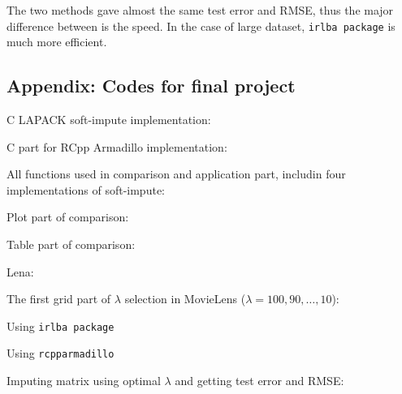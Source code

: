 \documentclass{article}
\begin{document}
	The two methods gave almost the same test error and RMSE, thus the major difference between is the speed. In the case of large dataset, \verb|irlba package| is much more efficient.

	\newpage

	
	

	\newpage

	\begin{appendices}
	\section{Appendix: Codes for final project}

	C LAPACK soft-impute implementation:

	
	\end{appendices}

	C part for RCpp Armadillo implementation:

	

	All functions used in comparison and application part, includin four implementations of soft-impute:

	

	Plot part of comparison:

	

	Table part of comparison:

	

	Lena:

	

	The first grid part of $\lambda$ selection in MovieLens ($\lambda = 100, 90, \ldots, 10$):

	Using \verb|irlba package|

	

	Using \verb|rcpparmadillo|
	
	

	Imputing matrix using optimal $\lambda$ and getting test error and RMSE:

	

	





	
	
\end{document}
